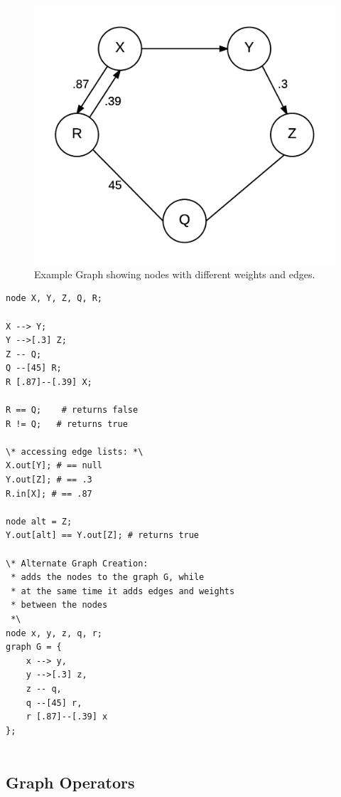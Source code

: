 \documentclass{article}
\begin{document}
\begin{figure}[H]
\centering
\includegraphics{graphs/node_operators_example.png}
\caption{Example Graph showing nodes with different weights and edges.}
\label{fig:node-ops}
\end{figure}


\begin{lstlisting}[language=pltLang, caption=Shows the use of node operators that creates the graph in Figure \ref{fig:node_ops}., label=lst:node-ops]
node X, Y, Z, Q, R;

X --> Y;
Y -->[.3] Z;
Z -- Q;
Q --[45] R;
R [.87]--[.39] X;

R == Q;    # returns false
R != Q;   # returns true

\* accessing edge lists: *\
X.out[Y]; # == null
Y.out[Z]; # == .3
R.in[X]; # == .87

node alt = Z;
Y.out[alt] == Y.out[Z]; # returns true

\* Alternate Graph Creation:
 * adds the nodes to the graph G, while
 * at the same time it adds edges and weights
 * between the nodes
 *\
node x, y, z, q, r;
graph G = {
    x --> y,
    y -->[.3] z,
    z -- q,
    q --[45] r,
    r [.87]--[.39] x
};
    

\end{lstlisting}

\subsection{Graph Operators}
\end{document}
